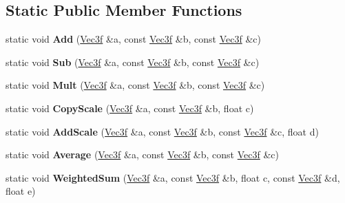 \subsection*{\-Static \-Public \-Member \-Functions}
\begin{DoxyCompactItemize}
\item 
\hypertarget{classVec3f_aacdb516f519347a97e3afb4b3eaf85cf}{static void {\bfseries \-Add} (\hyperlink{classVec3f}{\-Vec3f} \&a, const \hyperlink{classVec3f}{\-Vec3f} \&b, const \hyperlink{classVec3f}{\-Vec3f} \&c)}\label{classVec3f_aacdb516f519347a97e3afb4b3eaf85cf}

\item 
\hypertarget{classVec3f_adcc5b655fe33dd68e31ab8c583edb24e}{static void {\bfseries \-Sub} (\hyperlink{classVec3f}{\-Vec3f} \&a, const \hyperlink{classVec3f}{\-Vec3f} \&b, const \hyperlink{classVec3f}{\-Vec3f} \&c)}\label{classVec3f_adcc5b655fe33dd68e31ab8c583edb24e}

\item 
\hypertarget{classVec3f_a47a21f4964e17c407b4eab7b9e9c57ae}{static void {\bfseries \-Mult} (\hyperlink{classVec3f}{\-Vec3f} \&a, const \hyperlink{classVec3f}{\-Vec3f} \&b, const \hyperlink{classVec3f}{\-Vec3f} \&c)}\label{classVec3f_a47a21f4964e17c407b4eab7b9e9c57ae}

\item 
\hypertarget{classVec3f_a0051eb38dab417945be8b3944f17c905}{static void {\bfseries \-Copy\-Scale} (\hyperlink{classVec3f}{\-Vec3f} \&a, const \hyperlink{classVec3f}{\-Vec3f} \&b, float c)}\label{classVec3f_a0051eb38dab417945be8b3944f17c905}

\item 
\hypertarget{classVec3f_aa528c0a3de60ed84203ad55b301b1ac7}{static void {\bfseries \-Add\-Scale} (\hyperlink{classVec3f}{\-Vec3f} \&a, const \hyperlink{classVec3f}{\-Vec3f} \&b, const \hyperlink{classVec3f}{\-Vec3f} \&c, float d)}\label{classVec3f_aa528c0a3de60ed84203ad55b301b1ac7}

\item 
\hypertarget{classVec3f_a8cde49b7f82d31c0a8982481d6ad8135}{static void {\bfseries \-Average} (\hyperlink{classVec3f}{\-Vec3f} \&a, const \hyperlink{classVec3f}{\-Vec3f} \&b, const \hyperlink{classVec3f}{\-Vec3f} \&c)}\label{classVec3f_a8cde49b7f82d31c0a8982481d6ad8135}

\item 
\hypertarget{classVec3f_a57ef802daeae190571da7e5c480d4ccc}{static void {\bfseries \-Weighted\-Sum} (\hyperlink{classVec3f}{\-Vec3f} \&a, const \hyperlink{classVec3f}{\-Vec3f} \&b, float c, const \hyperlink{classVec3f}{\-Vec3f} \&d, float e)}\label{classVec3f_a57ef802daeae190571da7e5c480d4ccc}


\end{DoxyCompactItemize}
